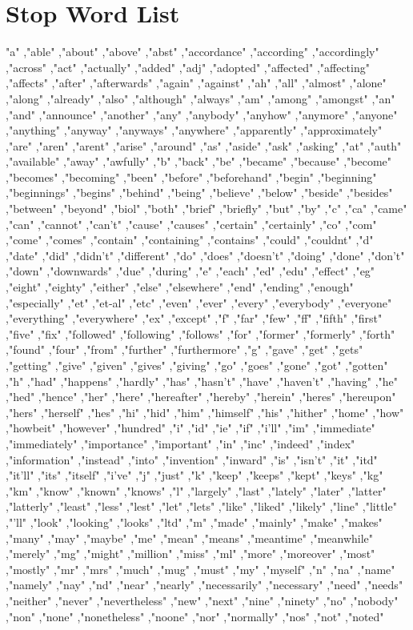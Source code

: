 \chapter{Stop Word List}
\label{chap:stopword}
"a" ,"able" ,"about" ,"above" ,"abst" ,"accordance" ,"according" ,"accordingly" ,"across" ,"act" ,"actually" ,"added" ,"adj" ,"adopted" ,"affected" ,"affecting" ,"affects" ,"after" ,"afterwards" ,"again" ,"against" ,"ah" ,"all" ,"almost" ,"alone" ,"along" ,"already" ,"also" ,"although" ,"always" ,"am" ,"among" ,"amongst" ,"an" ,"and" ,"announce" ,"another" ,"any" ,"anybody" ,"anyhow" ,"anymore" ,"anyone" ,"anything" ,"anyway" ,"anyways" ,"anywhere" ,"apparently" ,"approximately" ,"are" ,"aren" ,"arent" ,"arise" ,"around" ,"as" ,"aside" ,"ask" ,"asking" ,"at" ,"auth" ,"available" ,"away" ,"awfully" ,"b" ,"back" ,"be" ,"became" ,"because" ,"become" ,"becomes" ,"becoming" ,"been" ,"before" ,"beforehand" ,"begin" ,"beginning" ,"beginnings" ,"begins" ,"behind" ,"being" ,"believe" ,"below" ,"beside" ,"besides" ,"between" ,"beyond" ,"biol" ,"both" ,"brief" ,"briefly" ,"but" ,"by" ,"c" ,"ca" ,"came" ,"can" ,"cannot" ,"can't" ,"cause" ,"causes" ,"certain" ,"certainly" ,"co" ,"com" ,"come" ,"comes" ,"contain" ,"containing" ,"contains" ,"could" ,"couldnt" ,"d" ,"date" ,"did" ,"didn't" ,"different" ,"do" ,"does" ,"doesn't" ,"doing" ,"done" ,"don't" ,"down" ,"downwards" ,"due" ,"during" ,"e" ,"each" ,"ed" ,"edu" ,"effect" ,"eg" ,"eight" ,"eighty" ,"either" ,"else" ,"elsewhere" ,"end" ,"ending" ,"enough" ,"especially" ,"et" ,"et-al" ,"etc" ,"even" ,"ever" ,"every" ,"everybody" ,"everyone" ,"everything" ,"everywhere" ,"ex" ,"except" ,"f" ,"far" ,"few" ,"ff" ,"fifth" ,"first" ,"five" ,"fix" ,"followed" ,"following" ,"follows" ,"for" ,"former" ,"formerly" ,"forth" ,"found" ,"four" ,"from" ,"further" ,"furthermore" ,"g" ,"gave" ,"get" ,"gets" ,"getting" ,"give" ,"given" ,"gives" ,"giving" ,"go" ,"goes" ,"gone" ,"got" ,"gotten" ,"h" ,"had" ,"happens" ,"hardly" ,"has" ,"hasn't" ,"have" ,"haven't" ,"having" ,"he" ,"hed" ,"hence" ,"her" ,"here" ,"hereafter" ,"hereby" ,"herein" ,"heres" ,"hereupon" ,"hers" ,"herself" ,"hes" ,"hi" ,"hid" ,"him" ,"himself" ,"his" ,"hither" ,"home" ,"how" ,"howbeit" ,"however" ,"hundred" ,"i" ,"id" ,"ie" ,"if" ,"i'll" ,"im" ,"immediate" ,"immediately" ,"importance" ,"important" ,"in" ,"inc" ,"indeed" ,"index" ,"information" ,"instead" ,"into" ,"invention" ,"inward" ,"is" ,"isn't" ,"it" ,"itd" ,"it'll" ,"its" ,"itself" ,"i've" ,"j" ,"just" ,"k" ,"keep" ,"keeps" ,"kept" ,"keys" ,"kg" ,"km" ,"know" ,"known" ,"knows" ,"l" ,"largely" ,"last" ,"lately" ,"later" ,"latter" ,"latterly" ,"least" ,"less" ,"lest" ,"let" ,"lets" ,"like" ,"liked" ,"likely" ,"line" ,"little" ,"'ll" ,"look" ,"looking" ,"looks" ,"ltd" ,"m" ,"made" ,"mainly" ,"make" ,"makes" ,"many" ,"may" ,"maybe" ,"me" ,"mean" ,"means" ,"meantime" ,"meanwhile" ,"merely" ,"mg" ,"might" ,"million" ,"miss" ,"ml" ,"more" ,"moreover" ,"most" ,"mostly" ,"mr" ,"mrs" ,"much" ,"mug" ,"must" ,"my" ,"myself" ,"n" ,"na" ,"name" ,"namely" ,"nay" ,"nd" ,"near" ,"nearly" ,"necessarily" ,"necessary" ,"need" ,"needs" ,"neither" ,"never" ,"nevertheless" ,"new" ,"next" ,"nine" ,"ninety" ,"no" ,"nobody" ,"non" ,"none" ,"nonetheless" ,"noone" ,"nor" ,"normally" ,"nos" ,"not" ,"noted" 
